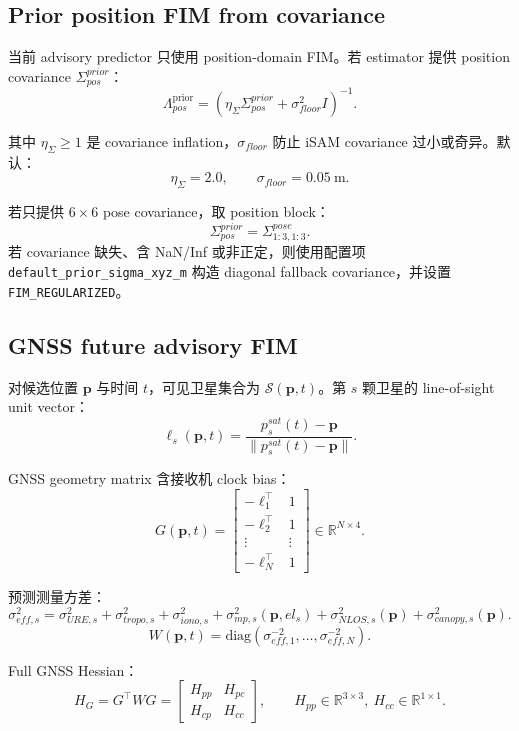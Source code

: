 \documentclass[11pt,a4paper]{article}
\newcommand{\Lam}{\Lambda}
\newcommand{\Sig}{\Sigma}
\newcommand{\pvec}{\mathbf{p}}
\newcommand{\prior}{\mathrm{prior}}
\newcommand{\diag}{\mathrm{diag}}
\begin{document}
\subsection{Prior position FIM from covariance}

当前 advisory predictor 只使用 position-domain FIM。若 estimator 提供 position covariance $\Sig^{prior}_{pos}$：
\[
  \boxed{
    \Lam^{\prior}_{pos}
    =
    \left(\eta_\Sigma\Sig^{prior}_{pos}+\sigma_{floor}^2I\right)^{-1}.
  }
\]

其中 $\eta_\Sigma\ge 1$ 是 covariance inflation，$\sigma_{floor}$ 防止 iSAM covariance 过小或奇异。默认：
\[
  \eta_\Sigma=2.0,
  \qquad
  \sigma_{floor}=0.05\ \mathrm{m}.
\]

若只提供 $6\times6$ pose covariance，取 position block：
\[
  \Sig^{prior}_{pos}=\Sig^{pose}_{1:3,1:3}.
\]
若 covariance 缺失、含 NaN/Inf 或非正定，则使用配置项 \texttt{default\_prior\_sigma\_xyz\_m} 构造 diagonal fallback covariance，并设置 \texttt{FIM\_REGULARIZED}。

\subsection{GNSS future advisory FIM}

对候选位置 $\pvec$ 与时间 $t$，可见卫星集合为 $\mathcal{S}(\pvec,t)$。第 $s$ 颗卫星的 line-of-sight unit vector：
\[
  \ell_s(\pvec,t)=\frac{p_s^{sat}(t)-\pvec}{\|p_s^{sat}(t)-\pvec\|}.
\]

GNSS geometry matrix 含接收机 clock bias：
\[
  G(\pvec,t)=
  \begin{bmatrix}
    -\ell_1^\top & 1\\
    -\ell_2^\top & 1\\
    \vdots & \vdots\\
    -\ell_N^\top & 1
  \end{bmatrix}
  \in\mathbb{R}^{N\times 4}.
\]

预测测量方差：
\[
  \sigma^2_{eff,s}
  =
  \sigma^2_{URE,s}
  +\sigma^2_{tropo,s}
  +\sigma^2_{iono,s}
  +\sigma^2_{mp,s}(\pvec,el_s)
  +\sigma^2_{NLOS,s}(\pvec)
  +\sigma^2_{canopy,s}(\pvec).
\]
\[
  W(\pvec,t)=\diag(\sigma^{-2}_{eff,1},\dots,\sigma^{-2}_{eff,N}).
\]

Full GNSS Hessian：
\[
  H_G=G^\top WG=
  \begin{bmatrix}
    H_{pp} & H_{pc}\\
    H_{cp} & H_{cc}
  \end{bmatrix},
  \qquad
  H_{pp}\in\mathbb{R}^{3\times3},\ H_{cc}\in\mathbb{R}^{1\times1}.
\]
\end{document}
